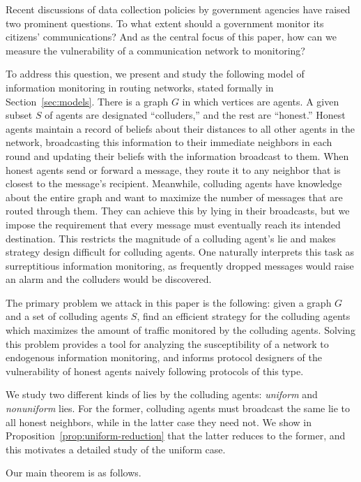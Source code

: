 \documentclass[prodmode,acmec]{ec-acmsmall}
\begin{document}
Recent discussions of data collection policies by government agencies have
raised two prominent questions. To what extent should a government monitor its
citizens' communications? And as the central focus of this paper, how can we
measure the vulnerability of a communication network to
monitoring?~\cite{GormanV13}

To address this question, we present and study the following model of
information monitoring in routing networks, stated formally in
Section~\ref{sec:models}. There is a graph $G$ in which vertices are agents. A
given subset $S$ of agents are designated ``colluders,'' and the rest are
``honest.'' Honest agents maintain a record of beliefs about their distances to
all other agents in the network, broadcasting this information to their
immediate neighbors in each round and updating their beliefs with the
information broadcast to them. When honest agents send or forward a message,
they route it to any neighbor that is closest to the message's recipient.
Meanwhile, colluding agents have knowledge about the entire graph and want to
maximize the number of messages that are routed through them. They can achieve
this by lying in their broadcasts, but we impose the requirement that every
message must eventually reach its intended destination. This restricts the
magnitude of a colluding agent's lie and makes strategy design difficult for
colluding agents. One naturally interprets this task as surreptitious
information monitoring, as frequently dropped messages would raise an alarm and
the colluders would be discovered. 

The primary problem we attack in this paper is the following: given a graph
$G$ and a set of colluding agents $S$, find an efficient strategy for the
colluding agents which maximizes the amount of traffic monitored by the
colluding agents. Solving this problem provides a tool for analyzing the
susceptibility of a network to endogenous information monitoring, and informs
protocol designers of the vulnerability of honest agents naively following 
protocols of this type.

We study two different kinds of lies by the colluding agents: \emph{uniform}
and \emph{nonuniform} lies. For the former, colluding agents must broadcast the
same lie to all honest neighbors, while in the latter case they need not. We
show in Proposition~\ref{prop:uniform-reduction} that the latter reduces to the
former, and this motivates a detailed study of the uniform case.

Our main theorem is as follows.
\end{document}
